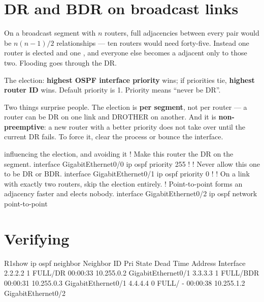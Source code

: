 \section{DR and BDR on broadcast links}

\begin{conceptbox}
On a broadcast segment with $n$ routers, full adjacencies between every pair
would be $n(n-1)/2$ relationships --- ten routers would need forty-five. Instead
one router is elected  and one , and everyone else becomes a
 adjacent only to those two. Flooding goes through the DR.

The election: \textbf{highest OSPF interface priority} wins; if priorities tie,
\textbf{highest router ID} wins. Default priority is 1. Priority  means
``never be DR''.

Two things surprise people. The election is \textbf{per segment}, not per router
--- a router can be DR on one link and DROTHER on another. And it is
\textbf{non-preemptive}: a new router with a better priority does not take over
until the current DR fails. To force it, clear the process or bounce the
interface.
\end{conceptbox}

\begin{config}{influencing the election, and avoiding it}
! Make this router the DR on the segment.
interface GigabitEthernet0/0
 ip ospf priority 255
!
! Never allow this one to be DR or BDR.
interface GigabitEthernet0/1
 ip ospf priority 0
!
! On a link with exactly two routers, skip the election entirely.
! Point-to-point forms an adjacency faster and elects nobody.
interface GigabitEthernet0/2
 ip ospf network point-to-point
\end{config}

\section{Verifying}

\begin{verify}{R1}{show ip ospf neighbor}
Neighbor ID     Pri   State           Dead Time   Address         Interface
2.2.2.2           1   FULL/DR         00:00:33    10.255.0.2      GigabitEthernet0/1
3.3.3.3           1   FULL/BDR        00:00:31    10.255.0.3      GigabitEthernet0/1
4.4.4.4           0   FULL/  -        00:00:38    10.255.1.2      GigabitEthernet0/2
\end{verify}

